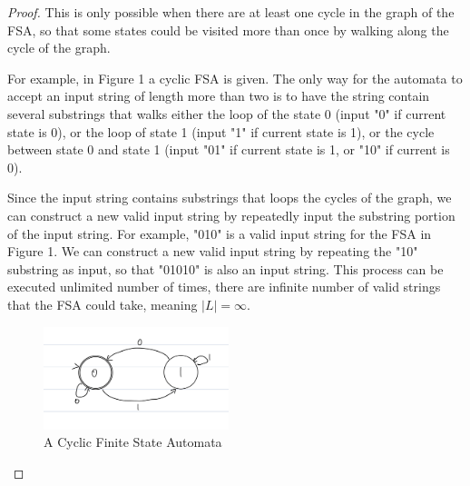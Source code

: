 \documentclass[11pt]{article}
\begin{document}
\begin{proof}
This is only possible when there are at least one cycle in the graph of the FSA, so that some states could be visited more than once by walking along the cycle of the graph.

For example, in Figure 1 a cyclic FSA is given. The only way for the automata to accept an input string of length more than two is to have the string contain several substrings that walks either the loop of the state 0 (input "0" if current state is 0), or the loop of state 1 (input "1" if current state is 1), or the cycle between state 0 and state 1 (input "01" if current state is 1, or "10" if current is 0).

Since the input string contains substrings that loops the cycles of the graph, we can construct a new valid input string by repeatedly input the substring portion of the input string. For example, "010" is a valid input string for the FSA in Figure 1. We can construct a new valid input string by repeating the "10" substring as input, so that "01010" is also an input string. This process can be executed unlimited number of times, there are infinite number of valid strings that the FSA could take, meaning $|L| = \infty$.

\begin{figure}[ht!]
  \centering
  \includegraphics[origin = c, height = 30mm]{pic.jpeg}
  \caption{A Cyclic Finite State Automata}
\end{figure}

\end{proof}
\end{document}
